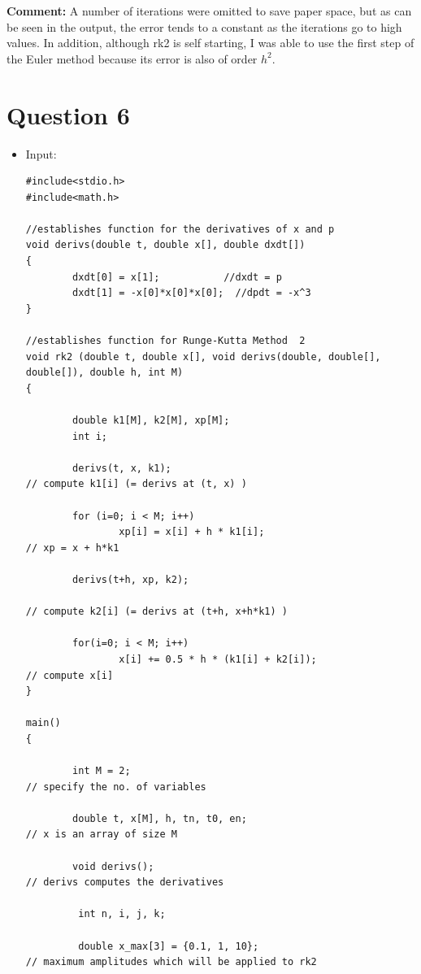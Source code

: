 \documentclass[10pt]{article}
\begin{document}
\textbf{Comment:} A number of iterations were omitted to save paper space, but as can be seen in the output, the error tends to a constant as the iterations go to high values. In addition, although rk2 is self starting, I was able to use the first step of the Euler method because its error is also of order $h^2$. 


\section{Question 6}
\begin{itemize}
\item Input:

\begin{verbatim}
#include<stdio.h>
#include<math.h>

//establishes function for the derivatives of x and p
void derivs(double t, double x[], double dxdt[])
{
        dxdt[0] = x[1];           //dxdt = p
        dxdt[1] = -x[0]*x[0]*x[0];  //dpdt = -x^3
}

//establishes function for Runge-Kutta Method  2
void rk2 (double t, double x[], void derivs(double, double[], double[]), double h, int M) 
{

        double k1[M], k2[M], xp[M];
        int i;
        
        derivs(t, x, k1); 
// compute k1[i] (= derivs at (t, x) )

        for (i=0; i < M; i++) 
                xp[i] = x[i] + h * k1[i]; 
// xp = x + h*k1

        derivs(t+h, xp, k2); 

// compute k2[i] (= derivs at (t+h, x+h*k1) )
 
        for(i=0; i < M; i++) 
                x[i] += 0.5 * h * (k1[i] + k2[i]); 
// compute x[i]
}

main()
{
 
        int M = 2; 
// specify the no. of variables
 
        double t, x[M], h, tn, t0, en; 
// x is an array of size M
 
        void derivs(); 
// derivs computes the derivatives

         int n, i, j, k;

         double x_max[3] = {0.1, 1, 10};
// maximum amplitudes which will be applied to rk2


\end{verbatim}
\end{itemize}
\end{document}
